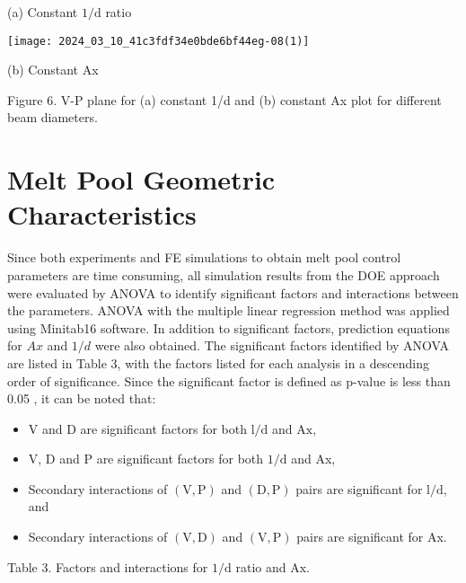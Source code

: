 \documentclass[10pt]{article}
\begin{document}
(a) Constant $1 / \mathrm{d}$ ratio

\begin{center}
\texttt{[image: 2024\_03\_10\_41c3fdf34e0bde6bf44eg-08(1)]}
\end{center}

(b) Constant Ax

Figure 6. V-P plane for (a) constant 1/d and (b) constant Ax plot for different beam diameters.

\section*{Melt Pool Geometric Characteristics}
Since both experiments and FE simulations to obtain melt pool control parameters are time consuming, all simulation results from the DOE approach were evaluated by ANOVA to identify significant factors and interactions between the parameters. ANOVA with the multiple linear regression method was applied using Minitab16 software. In addition to significant factors, prediction equations for $A x$ and $1 / d$ were also obtained. The significant factors identified by ANOVA are listed in Table 3, with the factors listed for each analysis in a descending order of significance. Since the significant factor is defined as $\mathrm{p}$-value is less than 0.05 , it can be noted that:

\begin{itemize}
  \item $\mathrm{V}$ and $\mathrm{D}$ are significant factors for both $\mathrm{l} / \mathrm{d}$ and $\mathrm{Ax}$,

  \item V, D and P are significant factors for both $1 / \mathrm{d}$ and Ax,

  \item Secondary interactions of $(\mathrm{V}, \mathrm{P})$ and $(\mathrm{D}, \mathrm{P})$ pairs are significant for $\mathrm{l} / \mathrm{d}$, and

  \item Secondary interactions of $(\mathrm{V}, \mathrm{D})$ and $(\mathrm{V}, \mathrm{P})$ pairs are significant for Ax.

\end{itemize}

Table 3. Factors and interactions for $1 / \mathrm{d}$ ratio and $\mathrm{Ax}$.
\end{document}

